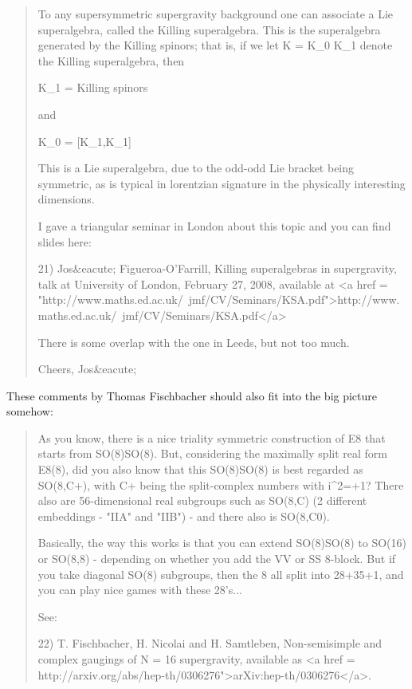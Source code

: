 \begin{quote}
To any supersymmetric supergravity background one can associate a Lie
superalgebra, called the Killing superalgebra.  This is the
superalgebra generated by the Killing spinors; that is, if we let
K = K_{0} \oplus  K_{1} denote the Killing superalgebra, then

K_{1} = {Killing spinors} 

and    

K_{0} = [K_{1},K_{1}]

This is a Lie superalgebra, due to the odd-odd Lie bracket being
symmetric, as is typical in lorentzian signature in the physically
interesting dimensions.

I gave a triangular seminar in London about this topic and you can
find slides here:

21) Jos&eacute; Figueroa-O'Farrill, Killing superalgebras in supergravity,
talk at University of London, February 27, 2008, available at
<a href = "http://www.maths.ed.ac.uk/~jmf/CV/Seminars/KSA.pdf">http://www.maths.ed.ac.uk/~jmf/CV/Seminars/KSA.pdf</a>

There is some overlap with the one in Leeds, but not too much.

Cheers, Jos&eacute;

\end{quote}

These comments by Thomas Fischbacher should also fit into the big
picture somehow:

\begin{quote}

   As you know, there is a nice triality symmetric construction of E8
   that starts from SO(8)\times SO(8). But, considering the maximally
   split real form E8(8), did you also know that this
   SO(8)\times SO(8) is best regarded as SO(8,C+), with C+ being the
   split-complex numbers with i^{2}=+1? There also are
   56-dimensional real subgroups such as SO(8,C) (2 different
   embeddings - "IIA" and "IIB") - and there also is SO(8,C0).

   Basically, the way this works is that you can extend
   SO(8)\times SO(8) to SO(16) or SO(8,8) - depending on whether you
   add the V\times V or S\times S 8-block. But if you take
   diagonal SO(8) subgroups, then the 8 all split into
   28+35+1, and you can play nice games with these 28's...

   See: 

   22) T. Fischbacher, H. Nicolai and H. Samtleben, Non-semisimple and
   complex gaugings of N = 16 supergravity, available as <a href = 
   http://arxiv.org/abs/hep-th/0306276">arXiv:hep-th/0306276</a>.

\end{quote}

